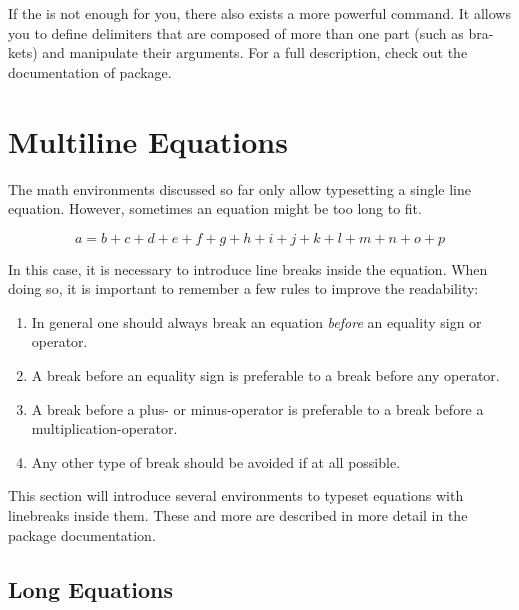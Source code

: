 If the  is not enough for you, there also exists
a more powerful  command. It allows you to define
delimiters that are composed of more than one part (such as bra-kets) and
manipulate their arguments. For a full description, check out the documentation
of  package.

\section{Multiline Equations}

The math environments discussed so far only allow typesetting a single line
equation. However, sometimes an equation might be too long to fit.
\begin{example}
\begin{equation}
  a = b + c + d + e + f
  + g + h + i + j
  + k + l + m + n + o + p
\end{equation}
\end{example}
In this case, it is necessary to introduce line breaks inside the equation. When
doing so, it is important to remember a few rules to improve the readability:
\begin{enumerate}
  \item In general one should always break an equation \emph{before} an
        equality sign or operator.
  \item A break before an equality sign is preferable to a break before
        any operator.
  \item A break before a plus- or minus-operator is preferable to a break
        before a multiplication-operator.
  \item Any other type of break should be avoided if at all possible.
\end{enumerate}

This section will introduce several environments to typeset equations with
linebreaks inside them. These and more are described in more detail in the
 package documentation.

\subsection{Long Equations}\label{sec:multline}

